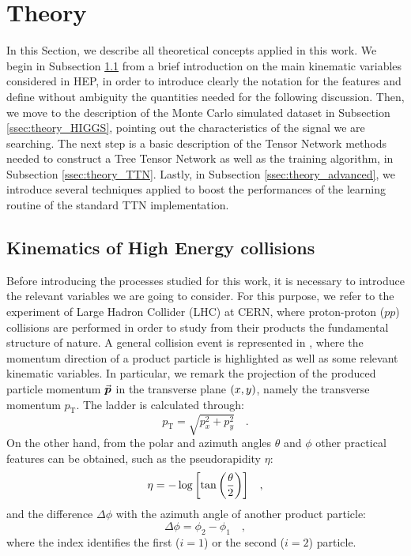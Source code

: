 \documentclass[../main/main.tex]{subfiles}
\begin{document}
\section{Theory}
\label{sec:theory}
In this Section, we describe all theoretical concepts applied in this work. We begin in Subsection \ref{ssec:theory_kinematics} from a brief introduction on the main kinematic variables considered in HEP, in order to introduce clearly the notation for the features and define without ambiguity the quantities needed for the following discussion. Then, we move to the description of the Monte Carlo simulated dataset in Subsection \ref{ssec:theory_HIGGS}, pointing out the characteristics of the signal we are searching. The next step is a basic description of the Tensor Network methods needed to construct a Tree Tensor Network as well as the training algorithm, in Subsection \ref{ssec:theory_TTN}. Lastly, in Subsection \ref{ssec:theory_advanced}, we introduce several techniques applied to boost the performances of the learning routine of the standard TTN implementation.



\subsection{Kinematics of High Energy collisions}
\label{ssec:theory_kinematics}
Before introducing the processes studied for this work, it is necessary to introduce the relevant variables we are going to consider. For this purpose, we refer to the experiment of Large Hadron Collider (LHC) at CERN, where proton-proton (\( pp \)) collisions are performed in order to study from their products the fundamental structure of nature. A general collision event is represented in , where the momentum direction of a product particle is highlighted as well as some relevant kinematic variables. In particular, we remark the projection of the produced particle momentum \( \va*{p} \) in the transverse plane \( \qty(x,y) \), namely the transverse momentum \( p_{\text{T}} \). The ladder is calculated through:
\begin{equation}
    p_{\text{T}}
    =
    \sqrt{p_{x}^{2} + p_{y}^{2}}
    \quad .
\end{equation}
On the other hand, from the polar and azimuth angles \( \theta \) and \( \phi \) other practical features can be obtained, such as the pseudorapidity \( \eta \):
\begin{equation}
    \eta
    =
    - \log\qty[\tan\qty(\frac{\theta}{2})]
    \quad ,
\end{equation}
and the difference \( \Delta \phi \) with the azimuth angle of another product particle:
\begin{equation}
    \Delta \phi
    =
    \phi_{2} - \phi_{1}
    \quad ,
\end{equation}
where the index identifies the first (\( i = 1 \)) or the second (\( i = 2 \)) particle.
\end{document}
